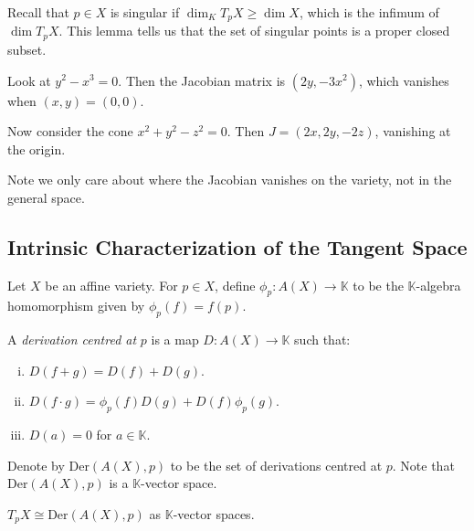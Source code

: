\documentclass[12pt]{article}
\begin{document}
Recall that $p \in X$ is singular if $\dim_K T_p X \geq \dim X$, which is the infimum of $\dim T_p X$. This lemma tells us that the set of singular points is a proper closed subset.

\begin{exbox}
	Look at $y^2 - x^3 = 0$. Then the Jacobian matrix is $(2y, - 3x^2)$, which vanishes when $(x, y) = (0,0)$.

	Now consider the cone $x^2 + y^2 - z^2 = 0$. Then $J = (2x, 2y, -2z)$, vanishing at the origin.
\end{exbox}

Note we only care about where the Jacobian vanishes on the variety, not in the general space.

\subsection{Intrinsic Characterization of the Tangent Space}
\label{sub:int_char_tp}

Let $X$ be an affine variety. For $p \in X$, define $\phi_p : A(X) \to \mathbb{K}$ to be the $\mathbb{K}$-algebra homomorphism given by $\phi_p(f) = f(p)$.

\begin{definition}
	A \emph{derivation centred at} $p$  is a map $D : A(X) \to \mathbb{K}$ such that:
	\begin{enumerate}[(i)]
		\item $D(f + g) = D(f) + D(g)$.
		\item $D(f \cdot g) = \phi_p(f) D(g) + D(f) \phi_p(g)$.
		\item $D(a) = 0$ for $a \in \mathbb{K}$.
	\end{enumerate}
	Denote by $\mathrm{Der}(A(X), p)$ to be the set of derivations centred at $p$. Note that $\mathrm{Der}(A(X), p)$ is a $\mathbb{K}$-vector space.
\end{definition}

\begin{theorem}
	$T_p X \cong \mathrm{Der}(A(X), p)$ as $\mathbb{K}$-vector spaces.
\end{theorem}
\end{document}
